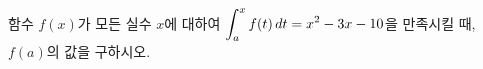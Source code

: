 함수 $f(x)$가 모든 실수 $x$에 대하여 $\displaystyle\int_{a}^{x}f(t)\mkern3mu dt=x^2-3x-10$을 만족시킬 때, $f(a)$의 값을 구하시오. 
